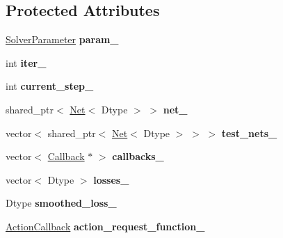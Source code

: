 \subsection*{Protected Attributes}
\begin{DoxyCompactItemize}
\item 
\mbox{\label{classcaffe_1_1_solver_a718d67175eba4eb6195b19ef38c3f17a}} 
\mbox{\hyperlink{classcaffe_1_1_solver_parameter}{Solver\+Parameter}} {\bfseries param\+\_\+}
\item 
\mbox{\label{classcaffe_1_1_solver_ade2a806f82be02b91f3c7c08d234dbbb}} 
int {\bfseries iter\+\_\+}
\item 
\mbox{\label{classcaffe_1_1_solver_a6531b137643b2acfd45ee57906a54f65}} 
int {\bfseries current\+\_\+step\+\_\+}
\item 
\mbox{\label{classcaffe_1_1_solver_ad24a2c083bae52e3d94e5186e40dd792}} 
shared\+\_\+ptr$<$ \mbox{\hyperlink{classcaffe_1_1_net}{Net}}$<$ Dtype $>$ $>$ {\bfseries net\+\_\+}
\item 
\mbox{\label{classcaffe_1_1_solver_a5ef575215992cf7293ecce1d887b2287}} 
vector$<$ shared\+\_\+ptr$<$ \mbox{\hyperlink{classcaffe_1_1_net}{Net}}$<$ Dtype $>$ $>$ $>$ {\bfseries test\+\_\+nets\+\_\+}
\item 
\mbox{\label{classcaffe_1_1_solver_afd0b33c413539395448ac5c791685a47}} 
vector$<$ \mbox{\hyperlink{classcaffe_1_1_solver_1_1_callback}{Callback}} $\ast$ $>$ {\bfseries callbacks\+\_\+}
\item 
\mbox{\label{classcaffe_1_1_solver_ab1126a0ab9b1af073a045dcaeaaedd4a}} 
vector$<$ Dtype $>$ {\bfseries losses\+\_\+}
\item 
\mbox{\label{classcaffe_1_1_solver_aaf306d832ed4706ea3168ac759dccc2b}} 
Dtype {\bfseries smoothed\+\_\+loss\+\_\+}
\item 
\mbox{\label{classcaffe_1_1_solver_a12a6f4f96ff0edf14d0fd4686b00fe33}} 
\mbox{\hyperlink{namespacecaffe_a117e25cc445c0d716517761a0fbc6daf}{Action\+Callback}} {\bfseries action\+\_\+request\+\_\+function\+\_\+}

\end{DoxyCompactItemize}
